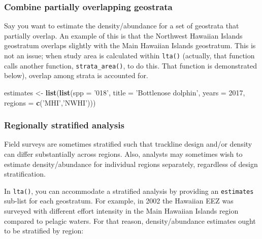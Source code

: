 \documentclass[
]{book}
\newenvironment{Shaded}{\begin{snugshade}}{\end{snugshade}}
\newcommand{\DataTypeTok}[1]{\textcolor[rgb]{0.13,0.29,0.53}{#1}}
\newcommand{\DecValTok}[1]{\textcolor[rgb]{0.00,0.00,0.81}{#1}}
\newcommand{\KeywordTok}[1]{\textcolor[rgb]{0.13,0.29,0.53}{\textbf{#1}}}
\newcommand{\NormalTok}[1]{#1}
\newcommand{\StringTok}[1]{\textcolor[rgb]{0.31,0.60,0.02}{#1}}
\begin{document}
\hypertarget{combine-partially-overlapping-geostrata}{%
\subsubsection*{Combine partially overlapping geostrata}\label{combine-partially-overlapping-geostrata}}

Say you want to estimate the density/abundance for a set of geostrata that partially overlap. An example of this is that the Northwest Hawaiian Islands geostratum overlaps slightly with the Main Hawaiian Islands geostratum. This is not an issue; when study area is calculated within \texttt{lta()} (actually, that function calls another function, \texttt{strata\_area()}, to do this. That function is demonstrated below), overlap among strata is accounted for.

\begin{Shaded}
\begin{Highlighting}[]
\NormalTok{estimates <-}\StringTok{ }\KeywordTok{list}\NormalTok{(}\KeywordTok{list}\NormalTok{(}\DataTypeTok{spp =} \StringTok{'018'}\NormalTok{,}
                       \DataTypeTok{title =} \StringTok{'Bottlenose dolphin'}\NormalTok{,}
                       \DataTypeTok{years =} \DecValTok{2017}\NormalTok{,}
                       \DataTypeTok{regions =} \KeywordTok{c}\NormalTok{(}\StringTok{'MHI'}\NormalTok{,}\StringTok{'NWHI'}\NormalTok{)))}
\end{Highlighting}
\end{Shaded}

\hypertarget{regionally-stratified-analysis}{%
\subsubsection*{Regionally stratified analysis}\label{regionally-stratified-analysis}}

Field surveys are sometimes stratified such that trackline design and/or density can differ substantially across regions. Also, analysts may sometimes wish to estimate density/abundance for individual regions separately, regardless of design stratification.

In \texttt{lta()}, you can accommodate a stratified analysis by providing an \texttt{estimates} sub-list for each geostratum. For example, in 2002 the Hawaiian EEZ was surveyed with different effort intensity in the Main Hawaiian Islands region compared to pelagic waters. For that reason, density/abundance estimates ought to be stratified by region:
\end{document}
